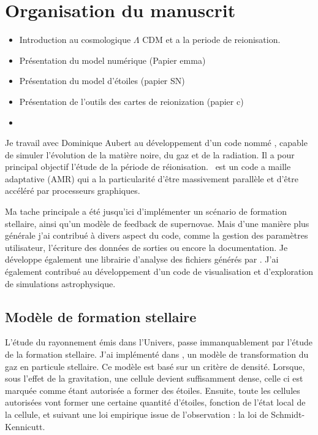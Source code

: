 \section{Organisation du manuscrit}
\begin{itemize}
\item Introduction au   cosmologique $\Lambda$ CDM et a la periode de reionisation.
\item Présentation du model numérique (Papier emma)
\item Présentation du model d'étoiles (papier SN)
\item Présentation de l'outils des cartes de reionization (papier c)
\item 
\end{itemize}




Je travail avec Dominique Aubert au développement d'un code nommé \emma, capable de simuler l'évolution de la matière noire, du gaz et de la radiation.
Il a pour principal objectif l'étude de la période de réionisation.
\emma\ est un code a maille adaptative (AMR) qui a la particularité d'être massivement parallèle et d'être accéléré par processeurs graphiques.

Ma tache principale a été jusqu'ici d'implémenter un scénario de formation stellaire, ainsi qu'un modèle de feedback de supernovae.
Mais d'une manière plus générale j'ai contribué à divers aspect du code, comme la gestion des paramètres utilisateur, l'écriture des données de sorties ou encore la documentation.
Je développe également une librairie d'analyse des fichiers générés par \emma.
J'ai également contribué au développement d'un code de visualisation et d'exploration de simulations astrophysique.

\subsection*{Mod\`ele de formation stellaire}
L'étude du rayonnement émis dans l'Univers, passe immanquablement par l'étude de la formation stellaire.
J'ai implémenté dans \emma, un modèle de transformation du gaz en particule stellaire.
Ce modèle est basé sur un critère de densité.
Lorsque, sous l'effet de la gravitation, une cellule devient suffisamment dense, celle ci est marquée comme étant autorisée a former des étoiles.
Ensuite, toute les cellules autorisées vont former une certaine quantité d'étoiles, fonction de l'état local de la cellule, et suivant une loi empirique issue de l'observation : la loi de Schmidt-Kennicutt.

